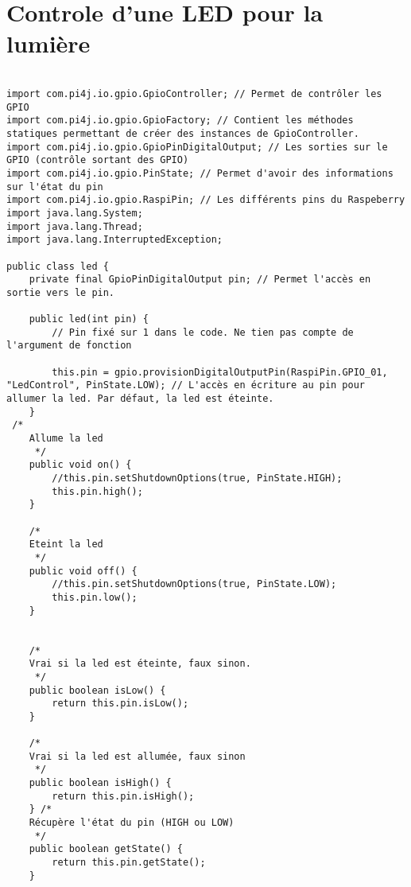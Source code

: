 \documentclass{article}
\newenvironment{DDbox}[1]{
\begin{lrbox}{\BBbox}\begin{minipage}{\linewidth}}
{\end{minipage}\end{lrbox}\noindent\colorbox{Zgris}{\usebox{\BBbox}} \\
[.5cm]}
\begin{document}
\section*{Controle d'une LED pour la lumière}
\begin{DDbox}{\linewidth}
\begin{lstlisting}

import com.pi4j.io.gpio.GpioController; // Permet de contrôler les GPIO
import com.pi4j.io.gpio.GpioFactory; // Contient les méthodes statiques permettant de créer des instances de GpioController.
import com.pi4j.io.gpio.GpioPinDigitalOutput; // Les sorties sur le GPIO (contrôle sortant des GPIO)
import com.pi4j.io.gpio.PinState; // Permet d'avoir des informations sur l'état du pin
import com.pi4j.io.gpio.RaspiPin; // Les différents pins du Raspeberry
import java.lang.System;
import java.lang.Thread;
import java.lang.InterruptedException;

public class led {
    private final GpioPinDigitalOutput pin; // Permet l'accès en sortie vers le pin.

    public led(int pin) {
        // Pin fixé sur 1 dans le code. Ne tien pas compte de l'argument de fonction

        this.pin = gpio.provisionDigitalOutputPin(RaspiPin.GPIO_01, "LedControl", PinState.LOW); // L'accès en écriture au pin pour allumer la led. Par défaut, la led est éteinte.
    }
 /*
    Allume la led
     */
    public void on() {
        //this.pin.setShutdownOptions(true, PinState.HIGH);
        this.pin.high();
    }

    /*
    Eteint la led
     */
    public void off() {
        //this.pin.setShutdownOptions(true, PinState.LOW);
        this.pin.low();
    }


    /*
    Vrai si la led est éteinte, faux sinon.
     */
    public boolean isLow() {
        return this.pin.isLow();
    }

    /*
    Vrai si la led est allumée, faux sinon
     */
    public boolean isHigh() {
        return this.pin.isHigh();
    } /*
    Récupère l'état du pin (HIGH ou LOW)
     */
    public boolean getState() {
        return this.pin.getState();
    }
\end{lstlisting}
\end{DDbox}
\newpage
\clearpage
\end{document}
